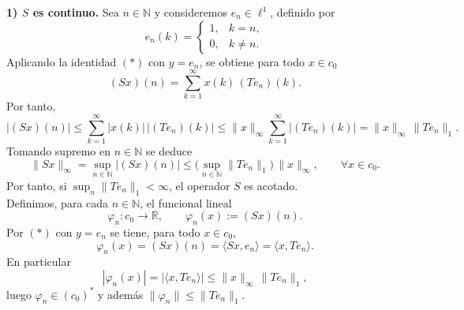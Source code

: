 \documentclass[12pt]{article}
\begin{document}
\begin{ejercicio}[2 puntos]
\begin{description}
            \textbf{1) $S$ es continuo.}
            Sea $n\in\mathbb N$ y consideremos $e_n\in\ell^1$, definido por
            \begin{equation*}
            e_n(k)=
            \begin{cases}
            1, & k=n,\\
            0, & k\neq n.
            \end{cases}
            \end{equation*}
            Aplicando la identidad $(\ast)$ con $y=e_n$, se obtiene para todo $x\in c_0$
            \begin{equation*}
            (Sx)(n)=\sum_{k=1}^\infty x(k)\,(Te_n)(k).
            \end{equation*}
            Por tanto,
            \begin{equation*}
            |(Sx)(n)|
            \le
            \sum_{k=1}^\infty |x(k)|\,|(Te_n)(k)|
            \le
            \|x\|_\infty \sum_{k=1}^\infty |(Te_n)(k)|
            =
            \|x\|_\infty\,\|Te_n\|_1.
            \end{equation*}
            Tomando supremo en $n\in\mathbb N$ se deduce
            \begin{equation*}
            \|Sx\|_\infty
            =
            \sup_{n\in\mathbb N}|(Sx)(n)|
            \le
            \Big(\sup_{n\in\mathbb N}\|Te_n\|_1\Big)\,\|x\|_\infty,
            \qquad \forall x\in c_0.
            \tag{1}
            \end{equation*}
            Por tanto, si $\sup_n\|Te_n\|_1<\infty$, el operador $S$ es acotado.\\

            
            Definimos, para cada $n\in\mathbb N$, el funcional lineal
            \begin{equation*}
            \varphi_n:c_0\to\mathbb R,\qquad \varphi_n(x):=(Sx)(n).
            \end{equation*}
            Por $(\ast)$ con $y=e_n$ se tiene, para todo $x\in c_0$,
            \begin{equation*}
            \varphi_n(x)=(Sx)(n)=\langle Sx,e_n\rangle=\langle x,Te_n\rangle.
            \end{equation*}
            En particular
            \begin{equation*}
            |\varphi_n(x)|=|\langle x,Te_n\rangle|\le \|x\|_\infty\,\|Te_n\|_1,
            \end{equation*}
            luego $\varphi_n\in (c_0)^\ast$ y además $\|\varphi_n\|\le \|Te_n\|_1$.
            

\end{description}
\end{ejercicio}
\end{document}
